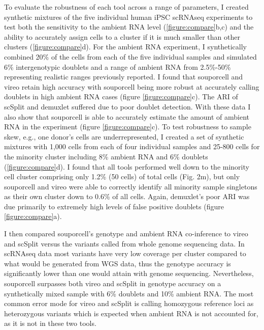 \par{
To evaluate the robustness of each tool across a range of parameters, I created synthetic mixtures of the five individual human iPSC scRNAseq experiments to test both the sensitivity to the ambient RNA level (\ref{figure:compare}b,c) and the ability to accurately assign cells to a cluster if it is much smaller than other clusters (\ref{figure:compare}d). For the ambient RNA experiment, I synthetically combined 20\% of the cells from each of the five individual samples and simulated 6\% intergenotypic doublets and a range of ambient RNA from 2.5\%-50\% representing realistic ranges previously reported\cite{soupx}. I found that souporcell and vireo retain high accuracy with souporcell being more robust at accurately calling doublets in high ambient RNA cases (figure \ref{figure:compare}c). The ARI of scSplit and demuxlet suffered due to poor doublet detection. With these data I also show that souporcell is able to accurately estimate the amount of ambient RNA in the experiment (figure \ref{figure:compare}c). To test robustness to sample skew, e.g., one donor's cells are underrepresented, I created a set of synthetic mixtures with 1,000 cells from each of four individual samples and 25-800 cells for the minority cluster including 8\% ambient RNA and 6\% doublets (\ref{figure:compare}d). I found that all tools performed well down to the minority cell cluster comprising only 1.2\% (50 cells) of total cells (Fig. 2m), but only souporcell and vireo were able to correctly identify all minority sample singletons as their own cluster down to 0.6\% of all cells. Again, demuxlet's poor ARI was due primarily to extremely high levels of false positive doublets (figure \ref{figure:compare}a).
}




\par{
I then compared souporcell's genotype and ambient RNA co-inference to vireo and scSplit versus the variants called from whole genome sequencing data. In scRNAseq data most variants have very low coverage per cluster compared to what would be generated from WGS data, thus the genotype accuracy is significantly lower than one would attain with genome sequencing. Nevertheless, souporcell surpasses both vireo and scSplit in genotype accuracy on a synthetically mixed sample with 6\% doublets and 10\% ambient RNA. The most common error mode for vireo and scSplit is calling homozygous reference loci as heterozygous variants  which is expected when ambient RNA is not accounted for, as it is not in these two tools.
}

